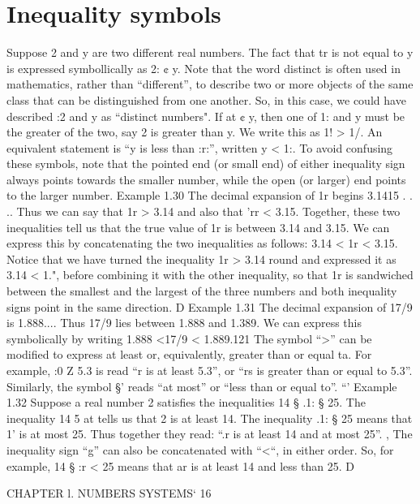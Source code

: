 \section{ Inequality symbols}
Suppose 2 and y are two different real numbers. The fact that tr is not equal to y is expressed
symbollically as
2: ¢ y.
Note that the word distinct is often used in mathematics, rather than “different”, to describe two
or more objects of the same class that can be distinguished from one another. So, in this case, we
could have described :2 and y as “distinct numbers".
If at ¢ y, then one of 1: and y must be the greater of the two, say 2 is greater than y. We write
this as
1! > 1/.
An equivalent statement is “y is less than :r:”, written
y < 1:.
To avoid confusing these symbols, note that the pointed end (or small end) of either inequality
sign always points towards the smaller number, while the open (or larger) end points to the larger
number.
Example 1.30 The decimal expansion of 1r begins 3.1415 . . .. Thus we can say that 1r > 3.14 and
also that 'rr < 3.15. Together, these two inequalities tell us that the true value of 1r is between 3.14
and 3.15. We can express this by concatenating the two inequalities as follows:
3.14 < 1r < 3.15.
Notice that we have turned the inequality 1r > 3.14 round and expressed it as 3.14 < 1.", before
combining it with the other inequality, so that 1r is sandwiched between the smallest and the largest
of the three numbers and both inequality signs point in the same direction. D
Example 1.31 The decimal expansion of 17/9 is 1.888.... Thus 17/9 lies between 1.888 and
1.389. We can express this symbolically by writing
1.888 <17/9 < 1.889.121
The symbol “>” can be modiﬁed to express at least or, equivalently, greater than or equal ta. For
example,
:0 Z 5.3
is read “r is at least 5.3”, or “rs is greater than or equal to 5.3”. Similarly, the symbol §’ reads
“at most” or “less than or equal to”. “'
Example 1.32 Suppose a real number 2 satisﬁes the inequalities 14 § .1: § 25. The inequality
14 5 at tells us that 2 is at least 14. The inequality .1: § 25 means that 1' is at most 25. Thus
together they read: “.r is at least 14 and at most 25”. ,
The inequality sign “g” can also be concatenated with “<“, in either order. So, for example,
14 § :r < 25 means that ar is at least 14 and less than 25. D



CHAPTER l. NUMBERS SYSTEMS‘ 16
